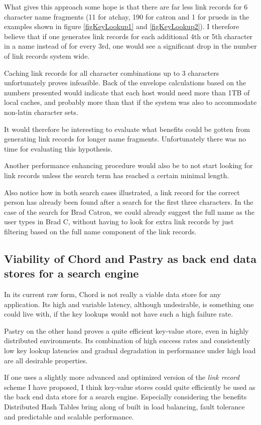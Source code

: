 What gives this approach some hope is that there are far less link records for 6 character name fragments (11 for atchay, 190 for catron and 1 for prueds in the examples shown in figure \ref{figKeyLookup1} and \ref{figKeyLookup2}). I therefore believe that if one generates link records for each additional 4th or 5th character in a name instead of for every 3rd, one would see a significant drop in the number of link records system wide.

Caching link records for all character combinations up to 3 characters unfortunately proves infeasible. Back of the envelope calculations based on the numbers presented would indicate that each host would need more than 1TB of local caches, and probably more than that if the system was also to accommodate non-latin character sets.

It would therefore be interesting to evaluate what benefits could be gotten from generating link records for longer name fragments. Unfortunately there was no time for evaluating this hypothesis.

Another performance enhancing procedure would also be to not start looking for link records unless the search term has reached a certain minimal length.

Also notice how in both search cases illustrated, a link record for the correct person has already been found after a search for the first three characters. In the case of the search for Brad Catron, we could already suggest the full name as the user types in Brad C, without having to look for extra link records by just filtering based on the full name component of the link records.


\subsection{Viability of Chord and Pastry as back end data stores for a search engine}
In its current raw form, Chord is not really a viable data store for any application. Its high and variable latency, although undesirable, is something one could live with, if the key lookups would not have such a high failure rate.

Pastry on the other hand proves a quite efficient key-value store, even in highly distributed environments. Its combination of high success rates and consistently low key lookup latencies and gradual degradation in performance under high load are all desirable properties.

If one uses a slightly more advanced and optimized version of the \emph{link record} scheme I have proposed, I think key-value stores could quite efficiently be used as the back end data store for a search engine. Especially considering the benefits Distributed Hash Tables bring along of built in load balancing, fault tolerance and predictable and scalable performance.

